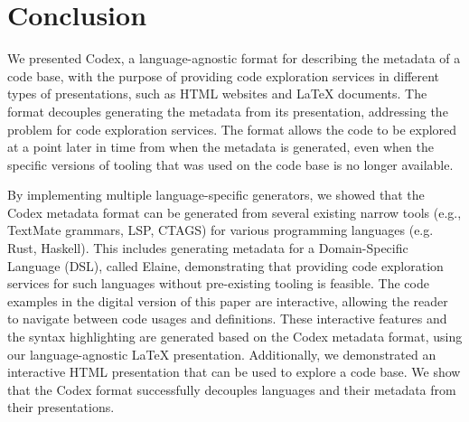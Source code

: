 \chapter{Conclusion}\label{chap:conclusion}


We presented Codex, a language-agnostic format for describing the metadata of a code base, with the purpose of providing code exploration services in different types of presentations, such as HTML websites and LaTeX documents.
The format decouples generating the metadata from its presentation, addressing  the \problem{\times} problem for code exploration services.
The format allows the code to be explored at a point later in time from when the metadata is generated, even when the specific versions of tooling that was used on the code base is no longer available.

By implementing multiple language-specific generators, we showed that the Codex metadata format can be generated from several existing narrow tools (e.g., TextMate grammars, LSP, CTAGS) for various programming languages (e.g. Rust, Haskell).
This includes generating metadata for a Domain-Specific Language (DSL), called Elaine, demonstrating that providing code exploration services for such languages without pre-existing tooling is feasible.
The code examples in the digital version of this paper are interactive, allowing the reader to navigate between code usages and definitions.
These interactive features and the syntax highlighting are generated based on the Codex metadata format, using our language-agnostic LaTeX presentation.
Additionally, we demonstrated an interactive HTML presentation that can be used to explore a code base.
We show that the Codex format successfully decouples languages and their metadata from their presentations.
